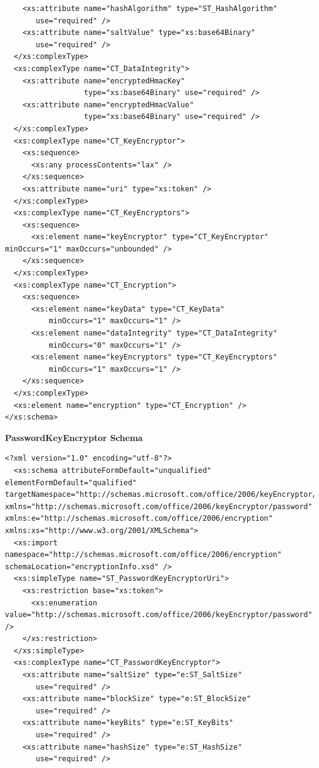 \documentclass[11pt,oneside]{fithesis2}
\begin{document}
\begin{appendix}
\begin{lstlisting}
    <xs:attribute name="hashAlgorithm" type="ST_HashAlgorithm"
       use="required" /> 
    <xs:attribute name="saltValue" type="xs:base64Binary" 
       use="required" /> 
  </xs:complexType>
  <xs:complexType name="CT_DataIntegrity"> 
    <xs:attribute name="encryptedHmacKey" 
                  type="xs:base64Binary" use="required" /> 
    <xs:attribute name="encryptedHmacValue" 
                  type="xs:base64Binary" use="required" /> 
  </xs:complexType>
  <xs:complexType name="CT_KeyEncryptor"> 
    <xs:sequence>
      <xs:any processContents="lax" /> 
    </xs:sequence>
    <xs:attribute name="uri" type="xs:token" /> 
  </xs:complexType>
  <xs:complexType name="CT_KeyEncryptors"> 
    <xs:sequence>
      <xs:element name="keyEncryptor" type="CT_KeyEncryptor" minOccurs="1" maxOccurs="unbounded" /> 
    </xs:sequence>
  </xs:complexType>
  <xs:complexType name="CT_Encryption"> 
    <xs:sequence>
      <xs:element name="keyData" type="CT_KeyData" 
          minOccurs="1" maxOccurs="1" /> 
      <xs:element name="dataIntegrity" type="CT_DataIntegrity" 
          minOccurs="0" maxOccurs="1" /> 
      <xs:element name="keyEncryptors" type="CT_KeyEncryptors"
          minOccurs="1" maxOccurs="1" /> 
    </xs:sequence>
  </xs:complexType>
  <xs:element name="encryption" type="CT_Encryption" /> 
</xs:schema>
	\end{lstlisting}
\textbf{PasswordKeyEncryptor Schema}\label{ei_password_encryptor}
	\begin{lstlisting}
<?xml version="1.0" encoding="utf-8"?>
  <xs:schema attributeFormDefault="unqualified" elementFormDefault="qualified" targetNamespace="http://schemas.microsoft.com/office/2006/keyEncryptor/password" xmlns="http://schemas.microsoft.com/office/2006/keyEncryptor/password" xmlns:e="http://schemas.microsoft.com/office/2006/encryption" xmlns:xs="http://www.w3.org/2001/XMLSchema"> 
  <xs:import namespace="http://schemas.microsoft.com/office/2006/encryption" schemaLocation="encryptionInfo.xsd" /> 
  <xs:simpleType name="ST_PasswordKeyEncryptorUri"> 
    <xs:restriction base="xs:token">
      <xs:enumeration value="http://schemas.microsoft.com/office/2006/keyEncryptor/password" />
    </xs:restriction>
  </xs:simpleType> 
  <xs:complexType name="CT_PasswordKeyEncryptor">
    <xs:attribute name="saltSize" type="e:ST_SaltSize" 
       use="required" />
    <xs:attribute name="blockSize" type="e:ST_BlockSize" 
       use="required" /> 
    <xs:attribute name="keyBits" type="e:ST_KeyBits" 
       use="required" />
    <xs:attribute name="hashSize" type="e:ST_HashSize" 
       use="required" /> 

\end{lstlisting}
\end{appendix}
\end{document}
